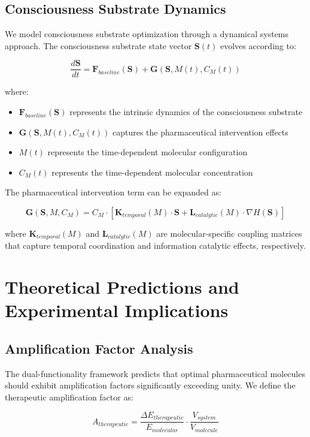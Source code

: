 \documentclass[12pt,a4paper]{article}
\begin{document}
\subsection{Consciousness Substrate Dynamics}

We model consciousness substrate optimization through a dynamical systems approach. The consciousness substrate state vector $\mathbf{S}(t)$ evolves according to:

$$\frac{d\mathbf{S}}{dt} = \mathbf{F}_{baseline}(\mathbf{S}) + \mathbf{G}(\mathbf{S}, M(t), C_M(t))$$

where:
\begin{itemize}
\item $\mathbf{F}_{baseline}(\mathbf{S})$ represents the intrinsic dynamics of the consciousness substrate
\item $\mathbf{G}(\mathbf{S}, M(t), C_M(t))$ captures the pharmaceutical intervention effects
\item $M(t)$ represents the time-dependent molecular configuration
\item $C_M(t)$ represents the time-dependent molecular concentration
\end{itemize}

The pharmaceutical intervention term can be expanded as:

$$\mathbf{G}(\mathbf{S}, M, C_M) = C_M \cdot \left[\mathbf{K}_{temporal}(M) \cdot \mathbf{S} + \mathbf{L}_{catalytic}(M) \cdot \nabla H(\mathbf{S})\right]$$

where $\mathbf{K}_{temporal}(M)$ and $\mathbf{L}_{catalytic}(M)$ are molecular-specific coupling matrices that capture temporal coordination and information catalytic effects, respectively.

\section{Theoretical Predictions and Experimental Implications}

\subsection{Amplification Factor Analysis}

The dual-functionality framework predicts that optimal pharmaceutical molecules should exhibit amplification factors significantly exceeding unity. We define the therapeutic amplification factor as:

$$A_{therapeutic} = \frac{\Delta E_{therapeutic}}{E_{molecular}} \cdot \frac{V_{system}}{V_{molecule}}$$
\end{document}
